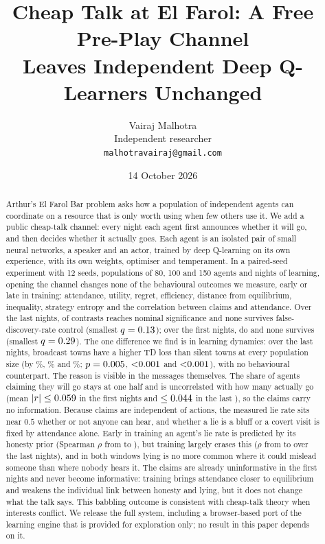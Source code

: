 \documentclass[11pt]{article}
\title{Cheap Talk at El Farol: A Free Pre-Play Channel\\Leaves Independent Deep Q-Learners Unchanged}
\author{Vairaj Malhotra\\\small Independent researcher\\\small\texttt{malhotravairaj@gmail.com}}
\date{14 October 2026}
\begin{document}
\maketitle

\begin{abstract}
Arthur's El Farol Bar problem asks how a population of independent agents can coordinate on a resource that is only worth using when few others use it. We add a public cheap-talk channel: every night each agent first announces whether it will go, and then decides whether it actually goes. Each agent is an isolated pair of small neural networks, a speaker and an actor, trained by deep Q-learning on its own experience, with its own weights, optimiser and temperament. In a paired-seed experiment with 12 seeds, populations of 80, 100 and 150 agents and \rnightsLong{} nights of learning, opening the channel changes none of the behavioural outcomes we measure, early or late in training: attendance, utility, regret, efficiency, distance from equilibrium, inequality, strategy entropy and the correlation between claims and attendance. Over the last \rnightsLate{} nights, \rnNominalLate{} of \rnTestsLate{} contrasts reaches nominal significance and none survives false-discovery-rate control (smallest $q = 0.13$); over the first \rnightsShort{} nights, \rnNominalShort{} do and none survives (smallest $q = 0.29$). The one difference we find is in learning dynamics: over the last \rnightsLate{} nights, broadcast towns have a higher TD loss than silent towns at every population size (by \rlossPctLXXX\%, \rlossPctC\% and \rlossPctCL\%; $p = 0.005$, $\rlossPC$ and $\rlossPCL$), with no behavioural counterpart. The reason is visible in the messages themselves. The share of agents claiming they will go stays at one half and is uncorrelated with how many actually go (mean $|r| \le 0.059$ in the first \rnightsShort{} nights and $\le 0.044$ in the last \rnightsLate), so the claims carry no information. Because claims are independent of actions, the measured lie rate sits near $0.5$ whether or not anyone can hear, and whether a lie is a bluff or a covert visit is fixed by attendance alone. Early in training an agent's lie rate is predicted by its honesty prior (Spearman $\rho$ from \rrhoLoShort{} to \rrhoHiShort), but training largely erases this ($\rho$ from \rrhoLoLate{} to \rrhoHiLate{} over the last \rnightsLate{} nights), and in both windows lying is no more common where it could mislead someone than where nobody hears it. The claims are already uninformative in the first \rnightsShort{} nights and never become informative: training brings attendance closer to equilibrium and weakens the individual link between honesty and lying, but it does not change what the talk says. This babbling outcome is consistent with cheap-talk theory when interests conflict. We release the full system, including a browser-based port of the learning engine that is provided for exploration only; no result in this paper depends on it.
\end{abstract}
\end{document}
